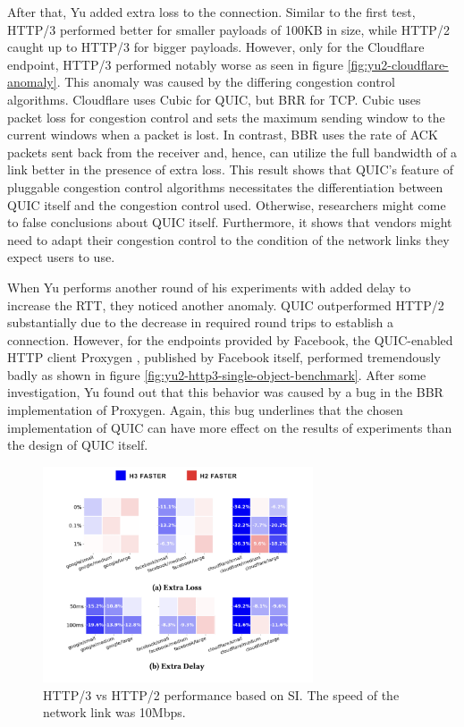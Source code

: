 \documentclass[conference]{IEEEtran}
\begin{document}
After that, Yu added extra loss to the connection. Similar to the first test, HTTP/3 performed better for smaller payloads of 100KB in size, while HTTP/2 caught up to HTTP/3 for bigger payloads. However, only for the Cloudflare endpoint, HTTP/3 performed notably worse as seen in figure \ref{fig:yu2-cloudflare-anomaly}. This anomaly was caused by the differing congestion control algorithms. Cloudflare uses Cubic for QUIC, but BRR for TCP. Cubic uses packet loss for congestion control and sets the maximum sending window to the current windows when a packet is lost. In contrast, BBR uses the rate of ACK packets sent back from the receiver and, hence, can utilize the full bandwidth of a link better in the presence of extra loss. This result shows that QUIC's feature of pluggable congestion control algorithms necessitates the differentiation between QUIC itself and the congestion control used. Otherwise, researchers might come to false conclusions about QUIC itself. Furthermore, it shows that vendors might need to adapt their congestion control to the condition of the network links they expect users to use.

When Yu performs another round of his experiments with added delay to increase the RTT, they noticed another anomaly. QUIC outperformed HTTP/2 substantially due to the decrease in required round trips to establish a connection. However, for the endpoints provided by Facebook, the QUIC-enabled HTTP client Proxygen \cite{Proxygen}, published by Facebook itself, performed tremendously badly as shown in figure \ref{fig:yu2-http3-single-object-benchmark}. After some investigation, Yu found out that this behavior was caused by a bug in the BBR implementation of Proxygen. Again, this bug underlines that the chosen implementation of QUIC can have more effect on the results of experiments than the design of QUIC itself.

\begin{figure}[htbp]
\includegraphics[width=8cm,keepaspectratio]{images/Yu2/HTTP3 Multiple objects benchmark.png}
\caption{HTTP/3 vs HTTP/2 performance based on SI. The speed of the network link was 10Mbps.}
\label{fig:yu2-http3-multiple-object-benchmark}
\end{figure}
\end{document}
